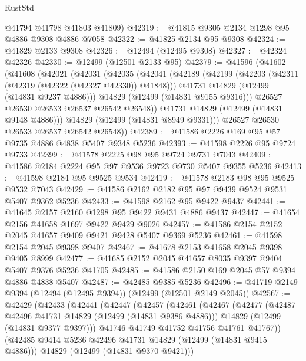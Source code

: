 \begin{lexlean}{RustStd}
\begin{coremodule}
{\begin{coremodule}
{{{{{{{{{{{{{{{{{{{{{{{{{{{{{{{{{{{{{{{{{{{{{{{{{{{{{{{{{{{{{{{{{{{{{{{{{{{{{{{{      @41794
      @41798
      @41803
      @41809)
@42319 := @41815 @9305 @2134 @1298 @95 @4886 @9308 @4886 @7058
@42322 := @41825 @2134 @95 @9308
@42324 := @41829 @2133 @9308
@42326 := @12494 (@12495 @9308)
@42327 := @42324 @42326
@42330 := @12499 (@12501 @2133 @95)
@42379 := @41596
    (@41602
      (@41608
        (@42021
          (@42031
            (@42035
              (@42041
                (@42189
                  (@42199
                    (@42203 (@42311 (@42319 (@42322 (@42327 @42330)) @41848)))
                    @41731
                    @14829
                    (@12499 (@14831 @9237 @4886)))
                  @14829
                  (@12499 (@14831 @9155 @9316)))
                @26527
                @26530
                @26533
                @26537
                @26542
                @26548))
            @41731
            @14829
            (@12499 (@14831 @9148 @4886)))
          @14829
          (@12499 (@14831 @8949 @9331)))
        @26527
        @26530
        @26533
        @26537
        @26542
        @26548))
@42389 := @41586 @2226 @169 @95 @57 @9735 @4886 @4838 @5407 @9348 @5236
@42393 := @41598 @2226 @95 @9724 @9733
@42399 := @41578 @2225 @98 @95 @9724 @9731 @7043
@42409 := @41586 @2184 @2224 @95 @97 @9536 @9723 @9730 @5407 @9355 @5236
@42413 := @41598 @2184 @95 @9525 @9534
@42419 := @41578 @2183 @98 @95 @9525 @9532 @7043
@42429 := @41586 @2162 @2182 @95 @97 @9439 @9524 @9531 @5407 @9362 @5236
@42433 := @41598 @2162 @95 @9422 @9437
@42441 := @41645 @2157 @2160 @1298 @95 @9422 @9431 @4886 @9437
@42447 := @41654 @2156 @41658 @1697 @9422 @9429 @9026
@42457 := @41586 @2154 @2152 @2045 @41657 @9409 @9421 @9428 @5407 @9369 @5236
@42461 := @41598 @2154 @2045 @9398 @9407
@42467 := @41678 @2153 @41658 @2045 @9398 @9405 @8999
@42477 := @41685 @2152 @2045 @41657 @8035 @9397 @9404 @5407 @9376 @5236 @41705
@42485 := @41586 @2150 @169 @2045 @57 @9394 @4886 @4838 @5407
@42487 := @42485 @9385 @5236
@42496 := @41719 @2149 @9394 (@12494 (@12495 @9394)) (@12499 (@12501 @2149 @2045))
@42567 := @42429
    (@42433
      (@42441
        (@42447
          (@42457
            (@42461
              (@42467
                (@42477
                  (@42487 @42496 @41731 @14829 (@12499 (@14831 @9386 @4886)))
                  @14829
                  (@12499 (@14831 @9377 @9397)))
                @41746
                @41749
                @41752
                @41756
                @41761
                @41767))
            (@42485 @9414 @5236 @42496 @41731 @14829 (@12499 (@14831 @9415 @4886)))
            @14829
            (@12499 (@14831 @9370 @9421)))
}}}}}}}}}}}}}}}}}}}}}}}}}}}}}}}}}}}}}}}}}}}}}}}}}}}}}}}}}}}}}}}}}}}}}}}}}}}}}}}}
\end{coremodule}}
\end{coremodule}
\end{lexlean}
